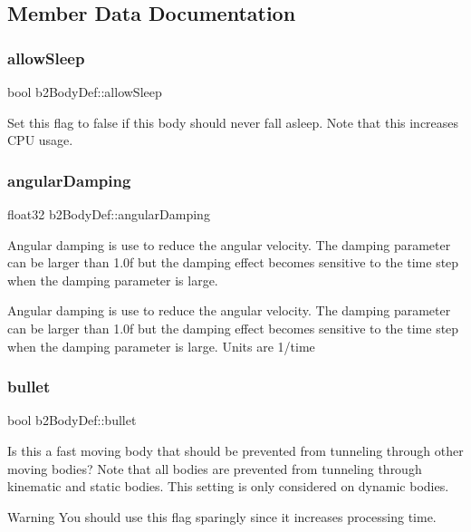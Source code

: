 \subsection{Member Data Documentation}
\mbox{\label{structb2BodyDef_a0765068172e521ed63cb34084c59c003}} 
\subsubsection{\texorpdfstring{allow\+Sleep}{allowSleep}}
{\footnotesize\ttfamily bool b2\+Body\+Def\+::allow\+Sleep}

Set this flag to false if this body should never fall asleep. Note that this increases C\+PU usage. \mbox{\label{structb2BodyDef_a01b8dc8ad9f0962efef9e4a8e836feb6}} 
\subsubsection{\texorpdfstring{angular\+Damping}{angularDamping}}
{\footnotesize\ttfamily float32 b2\+Body\+Def\+::angular\+Damping}

Angular damping is use to reduce the angular velocity. The damping parameter can be larger than 1.\+0f but the damping effect becomes sensitive to the time step when the damping parameter is large.

Angular damping is use to reduce the angular velocity. The damping parameter can be larger than 1.\+0f but the damping effect becomes sensitive to the time step when the damping parameter is large. Units are 1/time \mbox{\label{structb2BodyDef_a7c0047c9a98a1d20614eeddcdbce7586}} 
\subsubsection{\texorpdfstring{bullet}{bullet}}
{\footnotesize\ttfamily bool b2\+Body\+Def\+::bullet}

Is this a fast moving body that should be prevented from tunneling through other moving bodies? Note that all bodies are prevented from tunneling through kinematic and static bodies. This setting is only considered on dynamic bodies. \begin{DoxyWarning}{Warning}
You should use this flag sparingly since it increases processing time. 
\end{DoxyWarning}
\mbox{\label{structb2BodyDef_a728f6df3be7dedb331455105e3659d46}} 
